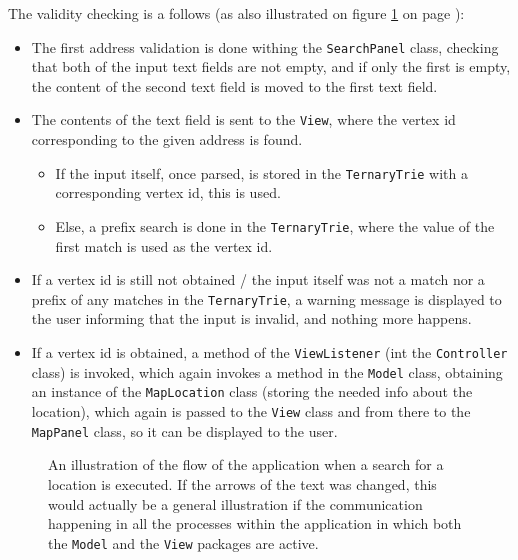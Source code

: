 \documentclass[a4paper,11pt]{article}
\begin{document}
The validity checking is a follows (as also illustrated on figure \ref{fig:ControlFlow} on page \pageref{fig:ControlFlow}):
\begin{itemize}
	\item The first address validation is done withing the \texttt{SearchPanel} class, checking that both of the input text fields are not empty, and if only the first is empty, the content of the second text field is moved to the first text field.
	\item The contents of the text field is sent to the \texttt{View}, where the vertex id corresponding to the given address is found.
	\begin{itemize}
		\item If the input itself, once parsed, is stored in the \texttt{TernaryTrie} with a corresponding vertex id, this is used.
		\item Else, a prefix search is done in the \texttt{TernaryTrie}, where the value of the first match is used as the vertex id.
	\end{itemize}
	\item If a vertex id is still not obtained / the input itself was not a match nor a prefix of any matches in the \texttt{TernaryTrie}, a warning message is displayed to the user informing that the input is invalid, and nothing more happens.
	\item If a vertex id is obtained, a method of the \texttt{ViewListener} (int the \texttt{Controller} class) is invoked, which again invokes a method in the \texttt{Model} class, obtaining an instance of the \texttt{MapLocation} class (storing the needed info about the location), which again is passed to the \texttt{View} class and from there to the \texttt{MapPanel} class, so it can be displayed to the user.
\end{itemize}

\begin{figure}[!h]
\centering
{}
\caption{An illustration of the flow of the application when a search for a location is executed. If the arrows of the text was changed, this would actually be a general illustration if the communication happening in all the processes within the application in which both the \texttt{Model} and the \texttt{View} packages are active.}
\label{fig:ControlFlow}
\end{figure}
\end{document}
